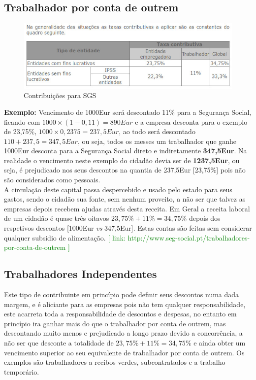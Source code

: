 \subsection{Trabalhador por conta de outrem}
\begin{figure}[H]
	\flushleft
	\includegraphics[scale=.5]{./image/SGS/Contribuicoes_1.jpg}
	\caption{Contribuições para SGS}
\end{figure}
\textbf{Exemplo:}
\newline
Vencimento de 1000Eur será descontado 11\% para a Segurança Social, ficando com $1000\times (1-0,11)=890Eur$ e a empresa desconta para o exemplo de 23,75\%, $1000\times 0,2375=237,5Eur$, ao todo será descontado $110+237,5=347,5Eur$, ou seja, todos os messes um trabalhador que ganhe 1000Eur desconta para a Segurança Social direto e indiretamente \textbf{347,5Eur}.
\emptyline
Na realidade o vencimento neste exemplo do cidadão devia ser de \textbf{1237,5Eur}, ou seja, é prejudicado nos seus descontos na quantia de 237,5Eur [23,75\%] pois não são considerados como pessoais. \\
A circulação deste capital passa despercebido e usado pelo estado para seus gastos, sendo o cidadão sua fonte, sem nenhum proveito, a não ser que talvez as empresas depois recebem ajudas através desta receita.
\emptyline
Em Geral a receita laboral de um cidadão é quase três oitavos $23,75\%+11\%=34,75\%$ depois dos respetivos descontos [1000Eur \textit{vs} 347,5Eur].
\emptyline
Estas contas são feitas sem considerar qualquer subsidio de alimentação.
\emptyline
\textcolor{green}{\small [ link: \quad http://www.seg-social.pt/trabalhadores-por-conta-de-outrem ]}
\subsection{Trabalhadores Independentes}
\qquad Este tipo de contribuinte em princípio pode definir seus descontos numa dada margem, e é aliciante para as empresas pois não tem qualquer responsabilidade, este acarreta toda a responsabilidade de descontos e despesas, no entanto em princípio ira ganhar mais do que o trabalhador por conta de outrem, mas descontando muito menos e prejudicado a longo prazo devido a concorrência, a não ser que desconte a totalidade de $23,75\%+11\%=34,75\%$ e ainda obter um vencimento superior ao seu equivalente de trabalhador por conta de outrem.
Os exemplos são trabalhadores a recibos verdes, subcontratados e a trabalho temporário.
